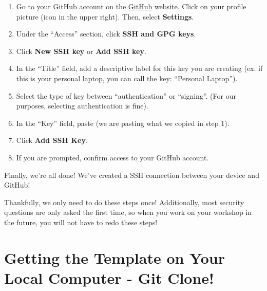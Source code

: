\documentclass[
]{book}
\theoremstyle{definition}
\theoremstyle{definition}
\theoremstyle{definition}
\theoremstyle{definition}
\theoremstyle{remark}
\begin{document}
\begin{enumerate}
\def\labelenumi{\arabic{enumi}.}
\setcounter{enumi}{1}
\item
  Go to your GitHub account on the \href{https://github.com/}{GitHub} website. Click on your profile picture (icon in the upper right). Then, select \textbf{Settings}.
\item
  Under the ``Access'' section, click \textbf{SSH and GPG keys}.
\item
  Click \textbf{New SSH key} or \textbf{Add SSH key}.
\item
  In the ``Title'' field, add a descriptive label for this key you are creating (ex. if this is your personal laptop, you can call the key:
  ``Personal Laptop'').
\item
  Select the type of key between ``authentication'' or ``signing''. (For our purposes, selecting authentication is fine).
\item
  In the ``Key'' field, paste (we are pasting what we copied in step 1).
\item
  Click \textbf{Add SSH Key}.
\item
  If you are prompted, confirm access to your GitHub account.
\end{enumerate}

Finally, we're all done! We've created a SSH connection between your device and GitHub!

Thankfully, we only need to do these steps once! Additionally, most security questions are only asked the first time, so when you work on your workshop in the future, you will not have to redo these steps!

\section{Getting the Template on Your Local Computer - Git Clone!}\label{git-clone}
\end{document}
